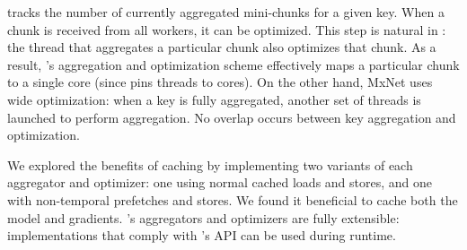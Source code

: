 \phub tracks the number of currently aggregated mini-chunks for a given key. When a chunk is received from all workers, it can be optimized. This step is natural in \phub: the thread that aggregates a particular chunk also optimizes that chunk. As a result, \phub{}'s aggregation and optimization scheme effectively maps a particular chunk to a single core (since \phub pins threads to cores). On the other hand, MxNet uses wide optimization: when a key is fully aggregated, another set of threads is launched to perform aggregation. No overlap occurs between key aggregation and optimization. 




We explored the benefits of caching by implementing two variants of each aggregator and optimizer: one using normal cached loads and stores, and one with non-temporal prefetches and stores. We found it beneficial to cache both the model and gradients. \phub{}'s aggregators and optimizers are fully extensible: implementations that comply with \phub{}'s API can be used during runtime.


